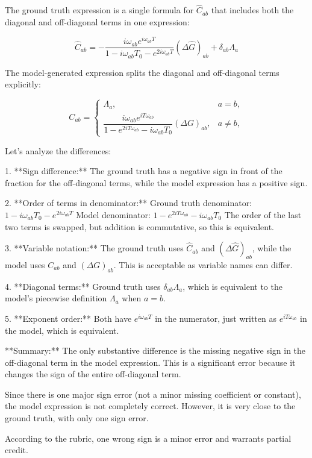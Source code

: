 \documentclass[10pt]{article}
\begin{document}
The ground truth expression is a single formula for \(\hat{C}_{ab}\) that includes both the diagonal and off-diagonal terms in one expression:

\[
\hat C_{ab} = -\frac{i\omega_{ab}e^{i\omega_{ab}T}}{1 - i\omega_{ab}T_0 - e^{2i\omega_{ab}T}} (\Delta \hat G)_{ab} + \delta_{ab} \Lambda_a
\]

The model-generated expression splits the diagonal and off-diagonal terms explicitly:

\[
C_{ab} = \begin{cases}
\Lambda_a, & a=b, \\
\dfrac{i \omega_{ab} e^{i T \omega_{ab}}}{1 - e^{2i T \omega_{ab}} - i \omega_{ab} T_0} (\Delta G)_{ab}, & a \neq b,
\end{cases}
\]

Let's analyze the differences:

1. **Sign difference:**  
   The ground truth has a negative sign in front of the fraction for the off-diagonal terms, while the model expression has a positive sign.

2. **Order of terms in denominator:**  
   Ground truth denominator: \(1 - i \omega_{ab} T_0 - e^{2i \omega_{ab} T}\)  
   Model denominator: \(1 - e^{2i T \omega_{ab}} - i \omega_{ab} T_0\)  
   The order of the last two terms is swapped, but addition is commutative, so this is equivalent.

3. **Variable notation:**  
   The ground truth uses \(\hat{C}_{ab}\) and \((\Delta \hat{G})_{ab}\), while the model uses \(C_{ab}\) and \((\Delta G)_{ab}\). This is acceptable as variable names can differ.

4. **Diagonal terms:**  
   Ground truth uses \(\delta_{ab} \Lambda_a\), which is equivalent to the model's piecewise definition \(\Lambda_a\) when \(a=b\).

5. **Exponent order:**  
   Both have \(e^{i \omega_{ab} T}\) in the numerator, just written as \(e^{i T \omega_{ab}}\) in the model, which is equivalent.

**Summary:**  
The only substantive difference is the missing negative sign in the off-diagonal term in the model expression. This is a significant error because it changes the sign of the entire off-diagonal term.

Since there is one major sign error (not a minor missing coefficient or constant), the model expression is not completely correct. However, it is very close to the ground truth, with only one sign error.

According to the rubric, one wrong sign is a minor error and warrants partial credit.
\end{document}
